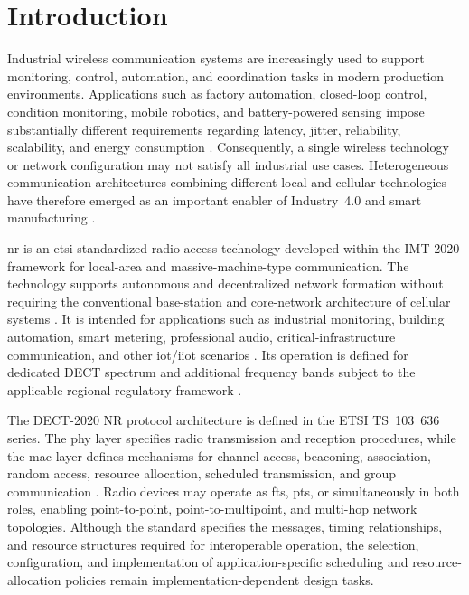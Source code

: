 \documentclass[12pt,a4paper]{article}
\begin{document}
\section{Introduction}

Industrial wireless communication systems are increasingly used to support monitoring, control, automation, and coordination tasks in modern production environments. Applications such as factory automation, closed-loop control, condition monitoring, mobile robotics, and battery-powered sensing impose substantially different requirements regarding latency, jitter, reliability, scalability, and energy consumption \cite{willigWirelessTechnologyIndustrial2005,vitturiIndustrialWirelessNetworks2013,wollschlaegerFutureIndustrialCommunication2017a}. Consequently, a single wireless technology or network configuration may not satisfy all industrial use cases. Heterogeneous communication architectures combining different local and cellular technologies have therefore emerged as an important enabler of Industry~4.0 and smart manufacturing \cite{alizaiHeterogeneousCommunicationNetworks2023a,karrenbauerFutureIndustrialNetworking2019a,aschenbrennerFlexiCell5GLocationbased2022a}.

\gls{nr} is an \gls{etsi}-standardized radio access technology developed within the IMT-2020 framework for local-area and massive-machine-type communication. The technology supports autonomous and decentralized network formation without requiring the conventional base-station and core-network architecture of cellular systems \cite{kovalchukovDECT2020NewRadio2022,perez-guiraoDECTNRUnveiling2022}. It is intended for applications such as industrial monitoring, building automation, smart metering, professional audio, critical-infrastructure communication, and other \gls{iot}/\gls{iiot} scenarios \cite{durreDECT2020NRProfessional2024,poetsProfessionalNetworkedAudio2025,biswasReliableLowLatencyCommunications2024}. Its operation is defined for dedicated DECT spectrum and additional frequency bands subject to the applicable regional regulatory framework \cite{etsi_tr103943}.

The DECT-2020 NR protocol architecture is defined in the ETSI TS~103~636 series. The \gls{phy} layer specifies radio transmission and reception procedures, while the \gls{mac} layer defines mechanisms for channel access, beaconing, association, random access, resource allocation, scheduled transmission, and group communication \cite{etsi_ts103636_1,etsi_ts103636_3,etsi_ts103636_4}. Radio devices may operate as \glspl{ft}, \glspl{pt}, or simultaneously in both roles, enabling point-to-point, point-to-multipoint, and multi-hop network topologies. Although the standard specifies the messages, timing relationships, and resource structures required for interoperable operation, the selection, configuration, and implementation of application-specific scheduling and resource-allocation policies remain implementation-dependent design tasks.
\end{document}
